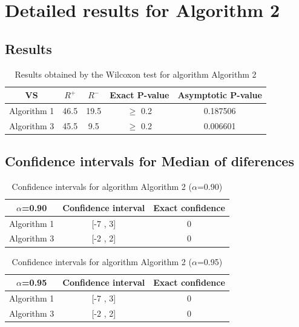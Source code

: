 \documentclass[a4paper,10pt]{article}
\begin{document}
 \clearpage 


\section{Detailed results for Algorithm 2}


\subsection{Results}

\begin{table}[!htp]
\centering\small
\begin{tabular}{
|c|c|c|c|c|}
\hline
 VS & $R^{+}$ & $R^{-}$ & Exact P-value & Asymptotic P-value \\ \hline 
Algorithm 1 & 46.5 & 19.5 & $\geq$ 0.2 & 0.187506\\ \hline 
Algorithm 3 & 45.5 & 9.5 & $\geq$ 0.2 & 0.006601\\ \hline 

\end{tabular}
\caption{Results obtained by the Wilcoxon test for algorithm Algorithm 2}
\end{table}

\subsection{Confidence intervals for Median of diferences}

\begin{table}[!htp]
\centering\small
\begin{tabular}{
|c|c|c|}
\hline
 $\alpha$=0.90 & Confidence interval & Exact confidence \\ \hline 
Algorithm 1 & [-7 , 3] & 0\\ \hline 
Algorithm 3 & [-2 , 2] & 0\\ \hline 

\end{tabular}
\caption{Confidence intervals for algorithm Algorithm 2 ($\alpha$=0.90)}
\end{table}
\begin{table}[!htp]
\centering\small
\begin{tabular}{
|c|c|c|}
\hline
 $\alpha$=0.95 & Confidence interval & Exact confidence \\ \hline 
Algorithm 1 & [-7 , 3] & 0\\ \hline 
Algorithm 3 & [-2 , 2] & 0\\ \hline 

\end{tabular}
\caption{Confidence intervals for algorithm Algorithm 2 ($\alpha$=0.95)}
\end{table}
\end{document}
